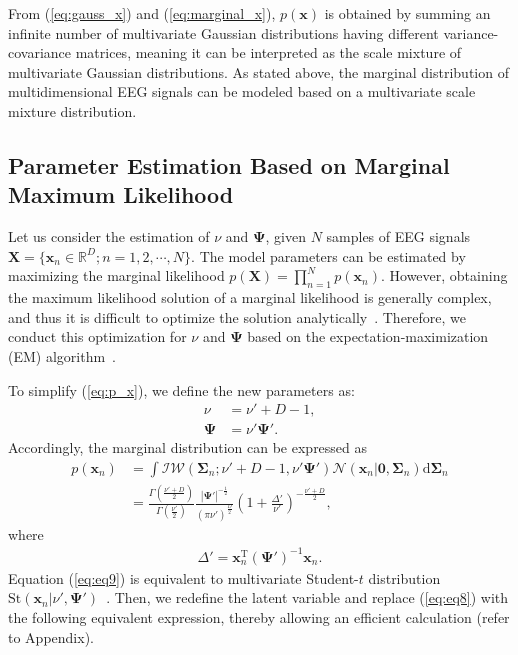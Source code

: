 \documentclass[journal]{IEEEtran}
\begin{document}
From (\ref{eq:gauss_x}) and (\ref{eq:marginal_x}), $p(\mathbf{x})$ is obtained by summing an infinite number of multivariate Gaussian distributions having different variance-covariance matrices, meaning it can be interpreted as the scale mixture of multivariate Gaussian distributions.
As stated above, the marginal distribution of multidimensional EEG signals can be modeled based on a multivariate scale mixture distribution.

\subsection{Parameter Estimation Based on Marginal Maximum Likelihood}
Let us consider the estimation of $\nu$ and $\mathbf{\Psi}$, given $N$ samples of EEG signals $\mathbf{X} = \{\mathbf{x}_n \in \mathbb{R}^{D}; n=1,2,\cdots,N \}$. The model parameters can be estimated by maximizing the marginal likelihood $p(\mathbf{X}) = \prod_{n=1}^{N} p(\mathbf{x}_n)$.
However, obtaining the maximum likelihood solution of a marginal likelihood is generally complex, and thus it is difficult to optimize the solution analytically~\cite{t2006}.
Therefore, we conduct this optimization for $\nu$ and $\mathbf{\Psi}$ based on the expectation-maximization (EM) algorithm~\cite{Models1998}.

To simplify (\ref{eq:p_x}), we define the new parameters as:
%
\begin{align}
	\label{eq:eq6}
	\nu&= \nu' + D - 1, \\
	\label{eq:eq7}
	\mathbf{\Psi}&= \nu' \mathbf{\Psi}'.
\end{align}
Accordingly, the marginal distribution can be expressed as
\begin{align}%
\label{eq:eq8}
p(\mathbf{x}_n) &=\int \mathcal{IW}(\mathbf{\Sigma}_n; \nu'+D-1, \nu' \mathbf{\Psi}') \mathcal{N}(\mathbf{x}_n|\mathbf{0}, \mathbf{\Sigma}_n) \mathrm{d} {\mathbf{\Sigma}_n} \\
\label{eq:eq9}
&=\frac{\Gamma(\frac{\nu'+D}{2})}{\Gamma(\frac{\nu'}{2})} \frac{|{\mathbf{\Psi}'}|^{-\frac{1}{2}}}{\left(\pi \nu' \right)^{\frac{D}{2}}} \left(1+\frac{\Delta '}{\nu '} \right)^{-\frac{\nu'+D}{2}},
\end{align}
where
\begin{align}
	\Delta ' = \mathbf{x}_n^\mathrm{T} ({\mathbf{\Psi} '})^{-1} \mathbf{x}_n.
\end{align}
Equation (\ref{eq:eq9}) is equivalent to multivariate Student-$t$ distribution $\mathrm{St}(\mathbf{x}_n|\nu', \mathbf{\Psi}')$~\cite{t2006}. %
Then, we redefine the latent variable and replace (\ref{eq:eq8}) with the following equivalent expression, thereby allowing an efficient calculation (refer to Appendix).
\end{document}
